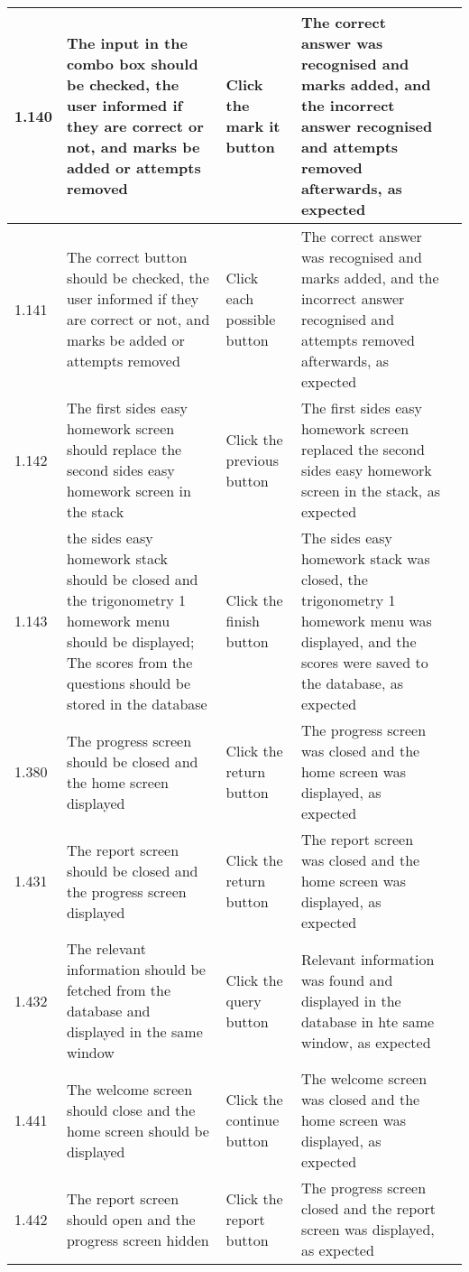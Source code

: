 \begin{landscape}
\begin{center}
\begin{longtable}{|p{2.5cm}|p{4cm}|p{4cm}|p{4.5cm}|p{3cm}|}
1.140 & The input in the combo box should be checked, the user informed if they are correct or not, and marks be added or attempts removed & Click the mark it button & The correct answer was recognised and marks added, and the incorrect answer recognised and attempts removed afterwards, as expected & \\ \hline
1.141 & The correct button should be checked, the user informed if they are correct or not, and marks be added or attempts removed & Click each possible button & The correct answer was recognised and marks added, and the incorrect answer recognised and attempts removed afterwards, as expected & \\ \hline
1.142 & The first sides easy homework screen should replace the second sides easy homework screen in the stack & Click the previous button & The first sides easy homework screen replaced the second sides easy homework screen in the stack, as expected & \\ \hline
1.143 & the sides easy homework stack should be closed and the trigonometry 1 homework menu should be displayed; The scores from the questions should be stored in the database & Click the finish button & The sides easy homework stack was closed, the trigonometry 1 homework menu was displayed, and the scores were saved to the database, as expected & \\ \hline
1.380 & The progress screen should be closed and the home screen displayed & Click the return button & The progress screen was closed and the home screen was displayed, as expected & \\ \hline
1.431 & The report screen should be closed and the progress screen displayed & Click the return button & The report screen was closed and the home screen was displayed, as expected & \\ \hline
1.432 & The relevant information should be fetched from the database and displayed in the same window & Click the query button & Relevant information was found and displayed in the database in hte same window, as expected & \\ \hline
1.441 & The welcome screen should close and the home screen should be displayed & Click the continue button & The welcome screen was closed and the home screen was displayed, as expected & \\ \hline
1.442 & The report screen should open and the progress screen hidden & Click the report button & The progress screen closed and the report screen was displayed, as expected & \\ \hline

\end{longtable}
\end{center}
\end{landscape}
